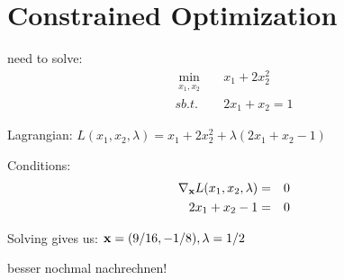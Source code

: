 \section*{Constrained Optimization}

need to solve: 
\begin{eqnarray}
    \min_{\substack{x_1,x_2}}&& x_1 + 2x_2^2\\
    sb.t. && 2x_1 + x_2 = 1
\end{eqnarray}

Lagrangian: $L(x_1,x_2,\lambda) = x_1 + 2x_2^2 + \lambda(2x_1 + x_2 - 1)$

Conditions:  
\begin{eqnarray}
    \nabla_{\bf{x}} L(x_1,x_2,\lambda) &=& 0 \\
    2x_1 + x_2 - 1 &=& 0 \\
\end{eqnarray}

Solving gives us: ${\bf x} = (9/16, -1/8), \lambda = 1/2 $


besser nochmal nachrechnen!